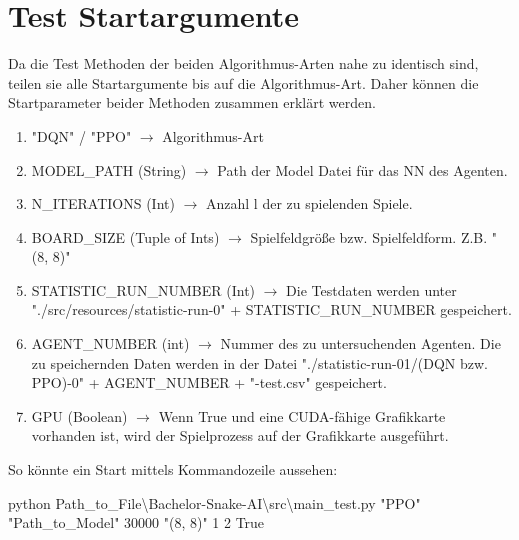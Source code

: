 \section{Test Startargumente}
Da die Test Methoden der beiden Algorithmus-Arten nahe zu identisch sind, teilen sie alle Startargumente bis auf die Algorithmus-Art. Daher können die Startparameter beider Methoden zusammen erklärt werden.
\begin{enumerate}
	\item "DQN" / "PPO" $\longrightarrow$ Algorithmus-Art	
	\item MODEL\_PATH (String) $\longrightarrow$ Path der Model Datei für das NN des Agenten.
	\item N\_ITERATIONS (Int) $\longrightarrow$ Anzahl l der zu spielenden Spiele.
	\item BOARD\_SIZE (Tuple of Ints) $\longrightarrow$ Spielfeldgröße bzw. Spielfeldform. Z.B. "(8, 8)"
	\item STATISTIC\_RUN\_NUMBER (Int) $\longrightarrow$ Die Testdaten werden unter "./src/resources/statistic-run-0" + STATISTIC\_RUN\_NUMBER gespeichert.
	\item AGENT\_NUMBER (int) $\longrightarrow$ Nummer des zu untersuchenden Agenten. Die zu speichernden Daten werden in der Datei "./statistic-run-01/(DQN bzw. PPO)-0" + AGENT\_NUMBER + "-test.csv" gespeichert.
	\item GPU (Boolean) $\longrightarrow$ Wenn True und eine CUDA-fähige Grafikkarte vorhanden ist, wird der Spielprozess auf der Grafikkarte ausgeführt.
\end{enumerate}
So könnte ein Start mittels Kommandozeile aussehen:
\begin{center}
	python Path\_to\_File\textbackslash Bachelor-Snake-AI\textbackslash src\textbackslash main\_test.py "PPO"{} "Path\_to\_Model"{} 30000 "(8, 8)"{} 1 2 True
\end{center}